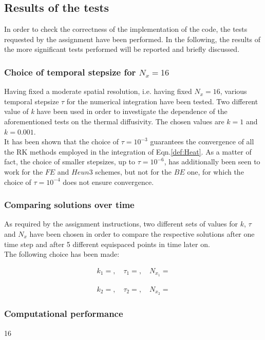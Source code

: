 \documentclass[11pt]{article}
\theoremstyle{theorem}
\theoremstyle{definition}
\begin{document}
\subsection{Results of the tests}
In order to check the correctness of the implementation of the code, the tests requested by the assignment have been performed. In the following, the results of the more significant tests performed will be reported and briefly discussed.\\

\subsubsection{Choice of temporal stepsize for $N_x=16$}
Having fixed a moderate spatial resolution, i.e. having fixed $N_x=16$, various temporal stepsize $\tau$ for the numerical integration have been tested. Two different value of \emph{k} have been used in order to investigate the dependence of the aforementioned tests on the thermal diffusivity. The chosen values are $k=1$ and $k=0.001$.\\
It has been shown that the choice of $\tau=10^{-3}$ guarantees the convergence of all the RK methods employed in the integration of Eqn.\ref{def:Heat}. As a matter of fact, the choice of smaller stepsizes, up to $\tau=10^{-6}$, has additionally been seen to work for the $FE$ and $Heun3$ schemes, but not for the $BE$ one, for which the choice of $\tau=10^{-4}$ does not ensure convergence.\\ 

\subsubsection{Comparing solutions over time}
As required by the assignment instructions, two different sets of values for $k$, $\tau$ and $N_x$ have been chosen in order to compare the respective solutions after one time step and after 5 different equispaced points in time later on.\\
The following choice has been made:

\begin{align}
	\label{eqn:set-1}
	k_1=, \quad\tau_1=, \quad N_{x_1}=
\end{align}

\begin{align}
\label{eqn:set-2}
k_2=, \quad\tau_2=, \quad N_{x_2}=
\end{align} 

\subsubsection{Computational performance}
16 
\end{document}
